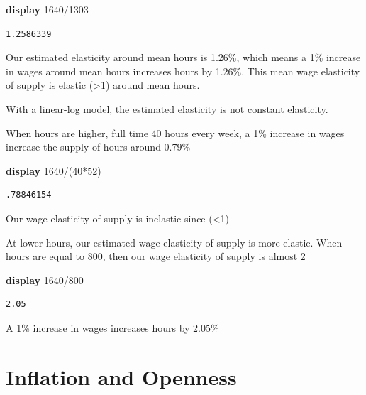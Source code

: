 \documentclass[
]{book}
\newenvironment{Shaded}{\begin{snugshade}}{\end{snugshade}}
\newcommand{\KeywordTok}[1]{\textcolor[rgb]{0.13,0.29,0.53}{\textbf{#1}}}
\newcommand{\NormalTok}[1]{#1}
\begin{document}
\begin{Shaded}
\begin{Highlighting}[]
\KeywordTok{display}\NormalTok{ 1640/1303}
\end{Highlighting}
\end{Shaded}

\begin{verbatim}
1.2586339
\end{verbatim}

Our estimated elasticity around mean hours is 1.26\%, which means a 1\% increase in wages around mean hours increases hours by 1.26\%. This mean wage elasticity of supply is elastic (\textgreater1) around mean hours.

With a linear-log model, the estimated elasticity is not constant elasticity.

When hours are higher, full time 40 hours every week, a 1\% increase in wages increase the supply of hours around 0.79\%

\begin{Shaded}
\begin{Highlighting}[]
    \KeywordTok{display}\NormalTok{ 1640/(40*52)}
\end{Highlighting}
\end{Shaded}

\begin{verbatim}
.78846154
\end{verbatim}

Our wage elasticity of supply is inelastic since (\textless1)

At lower hours, our estimated wage elasticity of supply is more elastic. When hours are equal to 800, then our wage elasticity of supply is almost 2

\begin{Shaded}
\begin{Highlighting}[]
\KeywordTok{display}\NormalTok{ 1640/800}
\end{Highlighting}
\end{Shaded}

\begin{verbatim}
2.05
\end{verbatim}

A 1\% increase in wages increases hours by 2.05\%

\section{Inflation and Openness}\label{inflation-and-openness}
\end{document}

